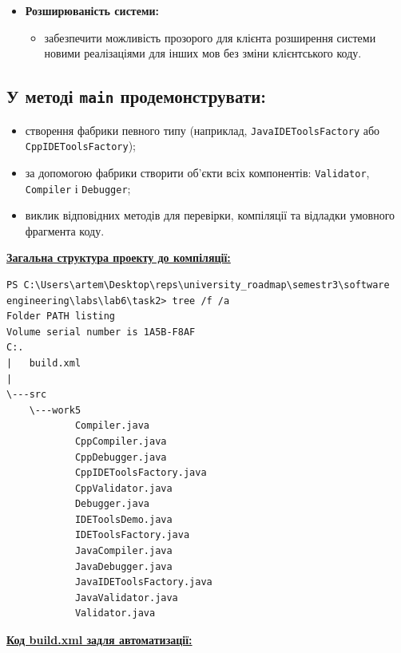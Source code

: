 \documentclass[12pt,a4paper]{article}
\begin{document}
\begin{itemize}
        \item \textbf{Розширюваність системи:}
        \begin{itemize}
            \item забезпечити можливість прозорого для клієнта розширення системи
            новими реалізаціями для інших мов без зміни клієнтського коду.
        \end{itemize}
    \end{itemize}

    \subsection*{У методі \texttt{main} продемонструвати:}

    \begin{itemize}
        \item створення фабрики певного типу (наприклад,
        \texttt{JavaIDEToolsFactory} або \texttt{CppIDEToolsFactory});
        \item за допомогою фабрики створити об’єкти всіх компонентів:
        \texttt{Validator}, \texttt{Compiler} і \texttt{Debugger};
        \item виклик відповідних методів для перевірки, компіляції
        та відладки умовного фрагмента коду.
    \end{itemize}

    \textbf{\underline{Загальна структура проекту до компіляції:}}

    \begin{verbatim}
PS C:\Users\artem\Desktop\reps\university_roadmap\semestr3\software engineering\labs\lab6\task2> tree /f /a
Folder PATH listing
Volume serial number is 1A5B-F8AF
C:.
|   build.xml
|   
\---src
    \---work5
            Compiler.java
            CppCompiler.java
            CppDebugger.java
            CppIDEToolsFactory.java
            CppValidator.java
            Debugger.java
            IDEToolsDemo.java
            IDEToolsFactory.java
            JavaCompiler.java
            JavaDebugger.java
            JavaIDEToolsFactory.java
            JavaValidator.java
            Validator.java
    \end{verbatim}

    \textbf{\underline{Код build.xml задля автоматизації:}}
\end{document}
